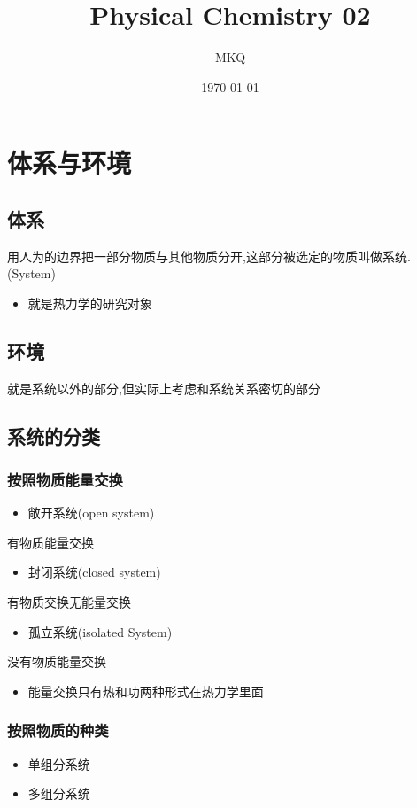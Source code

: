 \documentclass[11pt]{article}
\author{MKQ}
\date{\today}
\title{Physical Chemistry 02}
\begin{document}
\maketitle
\tableofcontents


\section{体系与环境}
\label{sec:orgaeb7a16}
\subsection{体系}
\label{sec:org4815413}
用人为的边界把一部分物质与其他物质分开,这部分被选定的物质叫做系统.
(System)

\begin{itemize}
\item 就是热力学的研究对象
\end{itemize}
\subsection{环境}
\label{sec:org403808f}
就是系统以外的部分,但实际上考虑和系统关系密切的部分
\subsection{系统的分类}
\label{sec:orgbc1a224}
\subsubsection{按照物质能量交换}
\label{sec:org3bca118}
\begin{itemize}
\item 敞开系统(open system)
\end{itemize}
有物质能量交换
\begin{itemize}
\item 封闭系统(closed system)
\end{itemize}
有物质交换无能量交换
\begin{itemize}
\item 孤立系统(isolated System)
\end{itemize}
没有物质能量交换

\begin{itemize}
\item 能量交换只有热和功两种形式在热力学里面
\end{itemize}
\subsubsection{按照物质的种类}
\label{sec:org5d7c96a}
\begin{itemize}
\item 单组分系统
\end{itemize}
\begin{itemize}
\item 多组分系统
\end{itemize}
\end{document}
